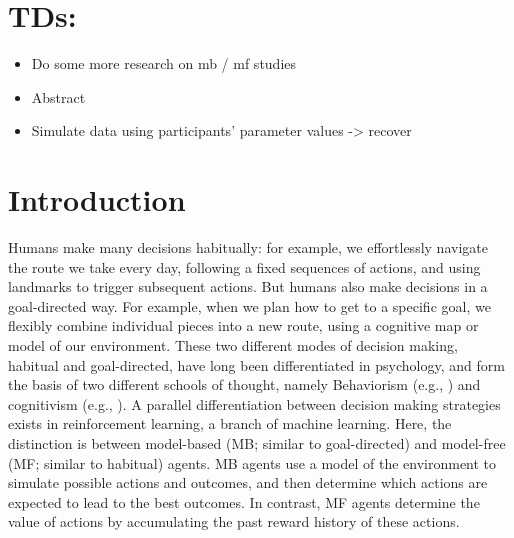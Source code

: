 \documentclass[11pt]{article} %
\begin{document}



\section*{TDs:}
\begin{itemize}
	\item Do some more research on mb / mf studies
	\item Abstract
	\item Simulate data using participants' parameter values -> recover
\end{itemize}

\startmain

\section{Introduction}

Humans make many decisions habitually: for example, we effortlessly navigate the route we take every day, following a fixed sequences of actions, and using landmarks to trigger subsequent actions. But humans also make decisions in a goal-directed way. For example, when we plan how to get to a specific goal, we flexibly combine individual pieces into a new route, using a cognitive map or model of our environment. These two different modes of decision making, habitual and goal-directed, have long been differentiated in psychology, and form the basis of two different schools of thought, namely Behaviorism (e.g., \cite{skinner_why_1977}) and cognitivism (e.g., \cite{tolman_cognitive_1948}). A parallel differentiation between decision making strategies exists in reinforcement learning, a branch of machine learning. Here, the distinction is between model-based (MB; similar to goal-directed) and model-free (MF; similar to habitual) agents. MB agents use a model of the environment to simulate possible actions and outcomes, and then determine which actions are expected to lead to the best outcomes. In contrast, MF agents determine the value of actions by accumulating the past reward history of these actions.
\end{document}
